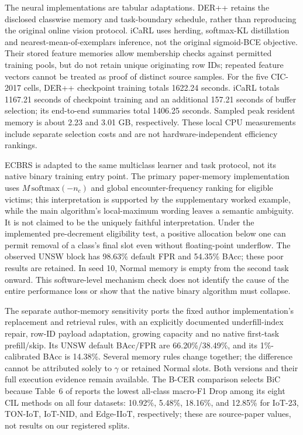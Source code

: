 \documentclass[10pt,twocolumn]{article}
\begin{document}
The neural implementations are tabular adaptations. DER++ retains the disclosed classwise memory and task-boundary schedule, rather than reproducing the original online vision protocol. iCaRL uses herding, softmax-KL distillation and nearest-mean-of-exemplars inference, not the original sigmoid-BCE objective. Their stored feature memories allow membership checks against permitted training pools, but do not retain unique originating row IDs; repeated feature vectors cannot be treated as proof of distinct source samples. For the five CIC-2017 cells, DER++ checkpoint training totals 1622.24 seconds. iCaRL totals 1167.21 seconds of checkpoint training and an additional 157.21 seconds of buffer selection; its end-to-end summaries total 1406.25 seconds. Sampled peak resident memory is about 2.23 and 3.01 GB, respectively. These local CPU measurements include separate selection costs and are not hardware-independent efficiency rankings.

ECBRS is adapted to the same multiclass learner and task protocol, not its native binary training entry point. The primary paper-memory implementation uses $M\,\mathrm{softmax}(-n_c)$ and global encounter-frequency ranking for eligible victims; this interpretation is supported by the supplementary worked example, while the main algorithm's local-maximum wording leaves a semantic ambiguity. It is not claimed to be the uniquely faithful interpretation. Under the implemented pre-decrement eligibility test, a positive allocation below one can permit removal of a class's final slot even without floating-point underflow. The observed UNSW block has 98.63\% default FPR and 54.35\% BAcc; these poor results are retained. In seed 10, Normal memory is empty from the second task onward. This software-level mechanism check does not identify the cause of the entire performance loss or show that the native binary algorithm must collapse.

The separate author-memory sensitivity ports the fixed author implementation's replacement and retrieval rules, with an explicitly documented underfill-index repair, row-ID payload adaptation, growing capacity and no native first-task prefill/skip. Its UNSW default BAcc/FPR are 66.20\%/38.49\%, and its 1\%-calibrated BAcc is 14.38\%. Several memory rules change together; the difference cannot be attributed solely to $\gamma$ or retained Normal slots. Both versions and their full execution evidence remain available. The B-CER comparison selects BiC because Table~6 of \citet{cerasuolo_comnet} reports the lowest all-class macro-F1 Drop among its eight CIL methods on all four datasets: 10.92\%, 5.48\%, 18.16\%, and 12.85\% for IoT-23, TON-IoT, IoT-NID, and Edge-IIoT, respectively; these are source-paper values, not results on our registered splits.
\end{document}
